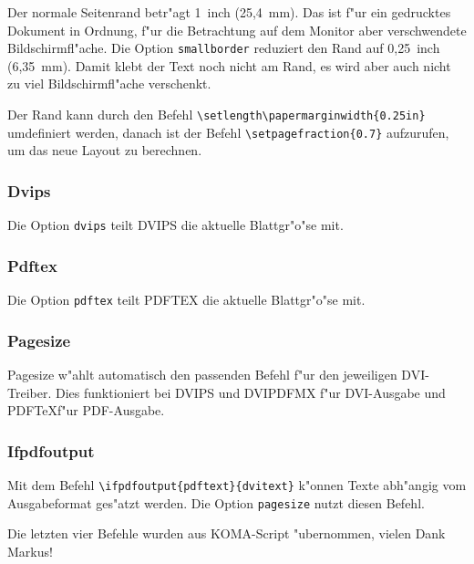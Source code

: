 Der normale Seitenrand betr"agt 1~inch (25,4~mm). Das ist f"ur ein gedrucktes
Dokument in Ordnung, f"ur die Betrachtung auf dem Monitor aber verschwendete
Bildschirmfl"ache. Die Option \verb|smallborder| reduziert den Rand auf 0,25~inch
(6,35~mm). Damit klebt der Text noch nicht am Rand, es wird aber auch nicht
zu viel Bildschirmfl"ache verschenkt.

Der Rand kann durch den Befehl \verb|\setlength\papermarginwidth|\verb|{0.25in}|
umdefiniert werden, danach ist der Befehl \verb|\setpagefraction{0.7}|
aufzurufen, um das neue Layout zu berechnen.

\subsubsection{Dvips}

Die Option \verb|dvips| teilt DVIPS die aktuelle Blattgr"o"se mit.

\subsubsection{Pdftex}

Die Option \verb|pdftex| teilt PDFTEX die aktuelle Blattgr"o"se mit.

\subsubsection{Pagesize}

Pagesize w"ahlt automatisch den passenden Befehl f"ur den jeweiligen
DVI-Treiber. Dies funktioniert bei DVIPS und DVIPDFMX f"ur DVI-Ausgabe und
PDF\TeX f"ur PDF-Ausgabe.

\subsubsection{Ifpdfoutput}

Mit dem Befehl \verb|\ifpdfoutput{pdftext}{dvitext}| k"onnen Texte abh"angig
vom Ausgabeformat ges"atzt werden. Die Option \verb|pagesize| nutzt diesen
Befehl.

Die letzten vier Befehle wurden aus KOMA-Script "ubernommen, vielen Dank
Markus!
\endinput

